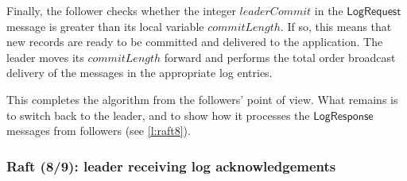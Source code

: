 Finally, the follower checks whether the integer $\mathit{leaderCommit}$ in the $\mathsf{LogRequest}$ message is greater than its local variable $\mathit{commitLength}$.
If so, this means that new records are ready to be committed and delivered to the application.
The leader moves its $\mathit{commitLength}$ forward and performs the total order broadcast delivery of the messages in the appropriate log entries.

This completes the algorithm from the followers' point of view.
What remains is to switch back to the leader, and to show how it processes the $\mathsf{LogResponse}$ messages from followers (see \autoref{l:raft8}).

\begin{frame}
    \label{s:raft8}
    \frametitle{Raft (8/9): leader receiving log acknowledgements}
    \footnotesize
\end{frame}
\label{l:raft8}

